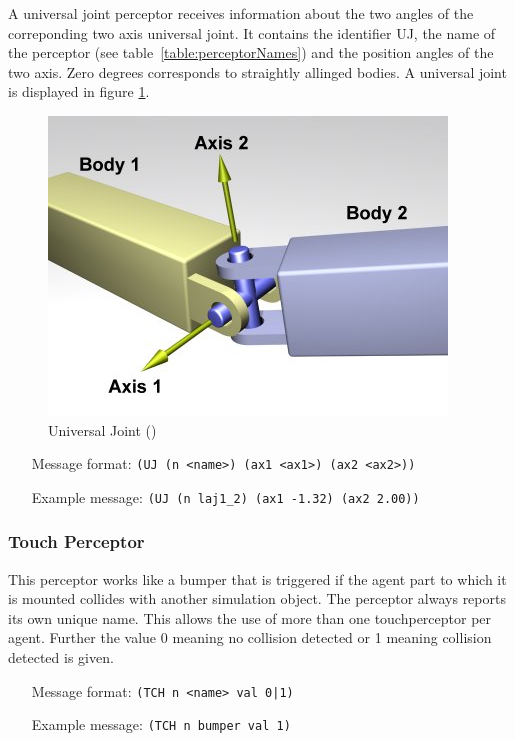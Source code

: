 A universal joint perceptor receives information about the two angles of the
correponding two axis universal joint. It contains the identifier UJ, the name
of the perceptor (see table~\ref{table:perceptorNames}) and the position angles
of the two axis. Zero degrees corresponds to straightly allinged bodies. A universal joint is
displayed in figure \ref{ode:universaljoint}. 
\begin{figure}[htbp]
  \begin{center}
	\includegraphics[scale=0.6]{fig/UniversalJoint.png}
    \caption{Universal Joint (\cite{ODEManual})}
    \label{ode:universaljoint}
  \end{center}
\end{figure}
 
\begin{itemize}
	\item[Message format:] \texttt{(UJ (n <name>) (ax1 <ax1>) (ax2 <ax2>))}
	\item[Example message:] \texttt{(UJ (n laj1\_2) (ax1 -1.32) (ax2 2.00))}
\end{itemize}

\subsubsection{Touch Perceptor}
\label{sec:touchperceptor}

This perceptor works like a bumper that is triggered if the agent part
to which it is mounted collides with another simulation object. The
perceptor always reports its own unique name. This allows the use of
more than one touchperceptor per agent. Further the value 0 meaning no
collision detected or 1 meaning collision detected is given.

\begin{itemize}
	\item[Message format:] \texttt{(TCH n <name> val 0|1)}
	\item[Example message:] \texttt{(TCH n bumper val 1)}
\end{itemize}


